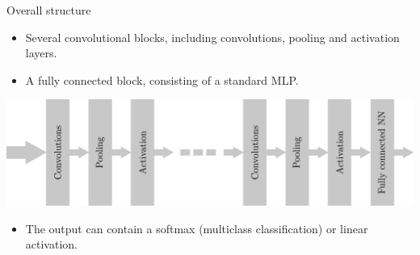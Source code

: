 \documentclass{beamer}
\begin{document}
\begin{frame}{Overall structure}
\begin{itemize}
\item Several convolutional blocks, including convolutions, pooling and activation layers.
\item A fully connected block, consisting of a standard MLP. 
\end{itemize}
\begin{center}
\includegraphics[scale=0.2]{Module 4 (CNN)/pics/CNN.pdf}
\end{center}
\begin{itemize}
    \item The output can contain a softmax (multiclass classification) or linear activation. 
\end{itemize}
\end{frame}
\end{document}
